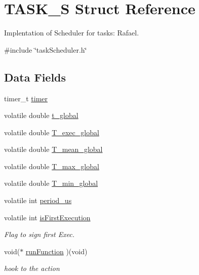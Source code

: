 \hypertarget{structTASK__S}{\section{T\-A\-S\-K\-\_\-\-S Struct Reference}
\label{structTASK__S}
}


Implentation of Scheduler for tasks\-:  Rafael.  




{\ttfamily \#include \char`\"{}task\-Scheduler.\-h\char`\"{}}

\subsection*{Data Fields}
\begin{DoxyCompactItemize}
\item 
timer\-\_\-t \hyperlink{structTASK__S_a17834f3d4f84241ccb4191f3cf7d7af3}{timer}
\item 
volatile double \hyperlink{structTASK__S_a29a175bdd4b9f880a2b69bb5186e3c7e}{t\-\_\-global}
\item 
volatile double \hyperlink{structTASK__S_ae06b712fd9963cff8192e9ef3140bc6d}{T\-\_\-exec\-\_\-global}
\item 
volatile double \hyperlink{structTASK__S_a9ebae87e1b64869f328a47473f2ea7d7}{T\-\_\-mean\-\_\-global}
\item 
volatile double \hyperlink{structTASK__S_a430c874cbf361b6dbc75ad1540880948}{T\-\_\-max\-\_\-global}
\item 
volatile double \hyperlink{structTASK__S_a07174e333a0013f4d51b30509b388f58}{T\-\_\-min\-\_\-global}
\item 
volatile int \hyperlink{structTASK__S_aabd8f80831e6cfd8e51bbd371eed907b}{period\-\_\-us}
\item 
volatile int \hyperlink{structTASK__S_a4b50404ee955691f1c62845cdc9de676}{is\-First\-Execution}
\begin{DoxyCompactList}\small\item\em Flag to sign first Exec. \end{DoxyCompactList}\item 
void($\ast$ \hyperlink{structTASK__S_a241d427891bed303812b78bd9f9ad86f}{run\-Function} )(void)
\begin{DoxyCompactList}\small\item\em hook to the action \end{DoxyCompactList}\end{DoxyCompactItemize}


